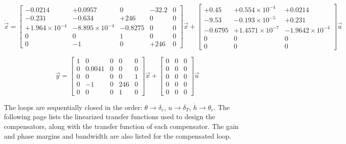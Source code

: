 \documentclass[11pt]{article}
\begin{document}
$$
\dot{\vec{x}} = \left[ \begin{array}{ccccc}
  -0.0214              &  +0.0957             &    0      &  -32.2 & 0 \\
   -0.231              &  -0.634              & +246      &    0   & 0 \\
   +1.964\times10^{-4} &  -8.895\times10^{-4} &   -0.8275 &    0   & 0 \\
    0                  &   0                  &    1      &    0   & 0 \\
    0                  &  -1                  &    0      & +246   & 0 \end{array} \right]
\vec{x} + \left[\begin{array}{ccc}
      +0.45            & +0.554\times10^{-4}  & +0.0214                \\ 
      -9.53            & -0.193\times10^{-5}  & +0.231                 \\
    -0.6795            & +1.4571\times10^{-7} & -1.9642\times10^{-4}   \\ 
          0            &  0                   &  0                     \\ 
          0            &  0                   &  0 \end{array}\right] \vec{u}  
$$

$$
\vec{y} = \left[ \begin{array}{ccccc}
         1 &   0      &   0   &    0   &  0 \\
         0 &   0.0041 &   0   &    0   &  0 \\
         0 &   0      &   0   &    0   &  1 \\
         0 &  -1      &   0   &  246   &  0 \\
         0 &   0      &   0   &    1   &  0 \end{array} \right]
\vec{x}+\left[\begin{array}{ccc}
         0 &   0      & 0 \\ 
         0 &   0      & 0 \\
         0 &   0      & 0 \\
         0 &   0      & 0 \\
         0 &   0      & 0 \end{array}\right]\vec{u}
$$
         
\vspace{25pt}
The loops are sequentially closed in the order: $\theta\rightarrow\delta_e$, $u\rightarrow\delta_T$, $\dot{h}\rightarrow\theta_e$.
The following page lists the linearized transfer functions used to design the compensators, along with the transfer function of each compensator.
The gain and phase margins and bandwidth are also listed for the compensated loop.
\end{document}
